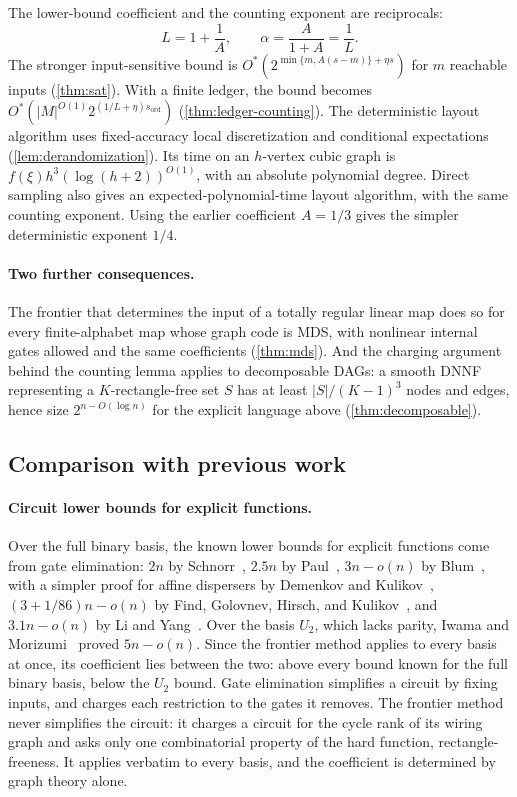 \documentclass[11pt]{article}
\theoremstyle{plain}
\theoremstyle{definition}
\theoremstyle{remark}
\newcommand{\card}[1]{\lvert #1\rvert}
\begin{document}
The lower-bound coefficient and the counting exponent are reciprocals:
\[
  L = 1 + \frac1A, \qquad \alpha = \frac{A}{1+A} = \frac1L.
\]
The stronger input-sensitive bound is
$O^*(2^{\min\{m,A(s-m)\}+\eta s})$ for $m$ reachable inputs (\cref{thm:sat}). With a finite
ledger, the bound becomes $O^*(\card M^{O(1)}2^{(1/L+\eta)s_{\mathrm{ord}}})$
(\cref{thm:ledger-counting}).
The deterministic layout algorithm uses fixed-accuracy local discretization and conditional
expectations (\cref{lem:derandomization}). Its time on an $h$-vertex cubic graph is
$f(\xi)h^3(\log(h+2))^{O(1)}$, with an absolute polynomial degree. Direct sampling also gives an
expected-polynomial-time layout algorithm, with the same counting exponent. Using the earlier coefficient $A=1/3$ gives
the simpler deterministic exponent $1/4$.

\paragraph{Two further consequences.}
The frontier that determines the input of a totally regular linear map does so for every
finite-alphabet map whose graph code is MDS, with nonlinear internal gates allowed and the same
coefficients (\cref{thm:mds}). And the charging argument behind the counting lemma applies to
decomposable DAGs: a smooth DNNF representing a $K$-rectangle-free set $S$ has at least
$\card S/(K-1)^3$ nodes and edges, hence size $2^{n - O(\log n)}$ for the explicit language above
(\cref{thm:decomposable}).

\subsection{Comparison with previous work}
\label{sec:related}

\paragraph{Circuit lower bounds for explicit functions.}
Over the full binary basis, the known lower bounds for explicit functions come from gate
elimination: $2n$ by Schnorr~\cite{Schnorr1974}, $2.5n$ by Paul~\cite{Paul1977}, $3n - o(n)$ by
Blum~\cite{Blum1984}, with a simpler proof for affine dispersers by Demenkov and
Kulikov~\cite{DemenkovKulikov2011}, $(3 + 1/86)n - o(n)$ by Find, Golovnev, Hirsch, and
Kulikov~\cite{FGHK2016}, and $3.1n - o(n)$ by Li and Yang~\cite{LiYang2022}. Over the basis
$U_2$, which lacks parity, Iwama and Morizumi~\cite{IwamaMorizumi2002} proved $5n - o(n)$. Since
the frontier method applies to every basis at once, its coefficient lies between the two: above
every bound known for the full binary basis, below the $U_2$ bound. Gate elimination
simplifies a circuit by fixing inputs, and charges each restriction to the gates it removes. The
frontier method never simplifies the circuit: it charges a circuit for the cycle rank of its
wiring graph and asks only one combinatorial property of the hard function, rectangle-freeness.
It applies verbatim to every basis, and the coefficient is determined by graph theory alone.
\end{document}
